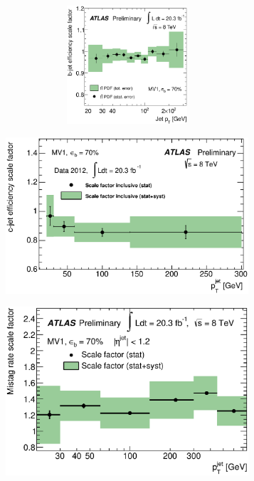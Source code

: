 \begin{figure}[tb!]
\centering
\begin{subfigure}[t]{0.45\textwidth}
\includegraphics[width=0.99\textwidth, height=4.4cm, keepaspectratio=false]{Objects/Figures/fig_02b_B_SF.eps}
\caption{}
\end{subfigure}
\begin{subfigure}[t]{0.45\textwidth}
  \includegraphics[width=0.99\textwidth]{Objects/Figures/fig_06_C_SF.eps}
   \caption{}
\end{subfigure}
\begin{subfigure}[t]{0.45\textwidth}
  \includegraphics[width=0.99\textwidth]{Objects/Figures/fig_08c_L_LB_SF.eps}

\end{subfigure}
\end{figure}
